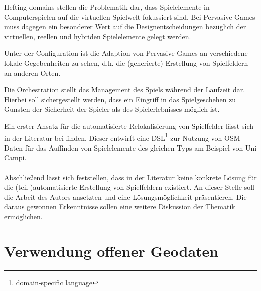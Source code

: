 Hefting domains stellen die Problematik dar, dass Spielelemente in Computerspielen auf die virtuellen Spielwelt fokussiert sind. Bei Pervasive Games muss dagegen ein besonderer Wert auf die Designentscheidungen bezüglich der virtuellen, reellen und hybriden Spielelemente gelegt werden.

Unter der Configuration ist die Adaption von Pervasive Games an verschiedene lokale Gegebenheiten zu sehen, d.h. die (generierte) Erstellung von Spielfeldern an anderen Orten.

Die Orchestration stellt das Management des Spiels während der Laufzeit dar. Hierbei soll sichergestellt werden, dass ein Eingriff in das Spielgeschehen zu Gunsten der Sicherheit der Spieler als des Spielerlebnisses möglich ist.

Ein erster Ansatz für die automatisierte Relokalisierung von Spielfelder lässt sich in der Literatur bei \textcite{Mannara.2012} finden. Dieser entwirft eine DSL\footnote{domain-specific language} zur Nutzung von OSM Daten für das Auffinden von Spielelemente des gleichen Typs am Beispiel von Uni Campi.
\\\\
Abschließend lässt sich feststellen, dass in der Literatur keine konkrete Lösung für die (teil-)automatisierte Erstellung von Spielfeldern existiert.
An dieser Stelle soll die Arbeit des Autors ansetzten und eine Lösungsmöglichkeit präsentieren.
Die daraus gewonnen Erkenntnisse sollen eine weitere Diskussion der Thematik ermöglichen.

\section{Verwendung offener Geodaten}
\label{ch3:s:offeneGeodaten}

